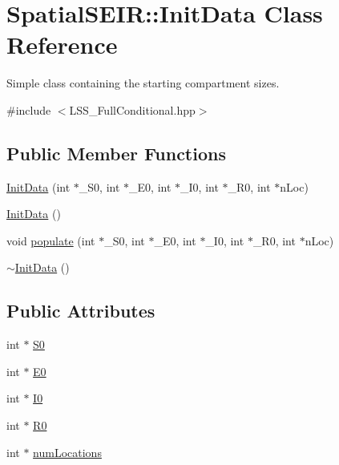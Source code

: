 \hypertarget{classSpatialSEIR_1_1InitData}{\section{Spatial\-S\-E\-I\-R\-:\-:Init\-Data Class Reference}
\label{classSpatialSEIR_1_1InitData}
}


Simple class containing the starting compartment sizes.  




{\ttfamily \#include $<$L\-S\-S\-\_\-\-Full\-Conditional.\-hpp$>$}

\subsection*{Public Member Functions}
\begin{DoxyCompactItemize}
\item 
\hyperlink{classSpatialSEIR_1_1InitData_afc3aab95825d04fdc7e8eac643ba815e}{Init\-Data} (int $\ast$\-\_\-\-S0, int $\ast$\-\_\-\-E0, int $\ast$\-\_\-\-I0, int $\ast$\-\_\-\-R0, int $\ast$n\-Loc)
\item 
\hyperlink{classSpatialSEIR_1_1InitData_a7d85d0f9287cb0dc484b85fad0a1df94}{Init\-Data} ()
\item 
void \hyperlink{classSpatialSEIR_1_1InitData_abfcf6cd81728b081dfe1b9ff1137b42b}{populate} (int $\ast$\-\_\-\-S0, int $\ast$\-\_\-\-E0, int $\ast$\-\_\-\-I0, int $\ast$\-\_\-\-R0, int $\ast$n\-Loc)
\item 
\hyperlink{classSpatialSEIR_1_1InitData_a9868dfc71831843b28c1480f79fffdc3}{$\sim$\-Init\-Data} ()
\end{DoxyCompactItemize}
\subsection*{Public Attributes}
\begin{DoxyCompactItemize}
\item 
int $\ast$ \hyperlink{classSpatialSEIR_1_1InitData_a349ab7c6e53a1777cd119e59a995c781}{S0}
\item 
int $\ast$ \hyperlink{classSpatialSEIR_1_1InitData_a17086ef1f134d23265360450ed24e77c}{E0}
\item 
int $\ast$ \hyperlink{classSpatialSEIR_1_1InitData_a393dd2e968876861412439caf2e3c05b}{I0}
\item 
int $\ast$ \hyperlink{classSpatialSEIR_1_1InitData_a45a1241af922fb151c91cb669cbdf106}{R0}
\item 
int $\ast$ \hyperlink{classSpatialSEIR_1_1InitData_aa9bc45e52403b6a9779acf3ab51f451b}{num\-Locations}
\end{DoxyCompactItemize}


